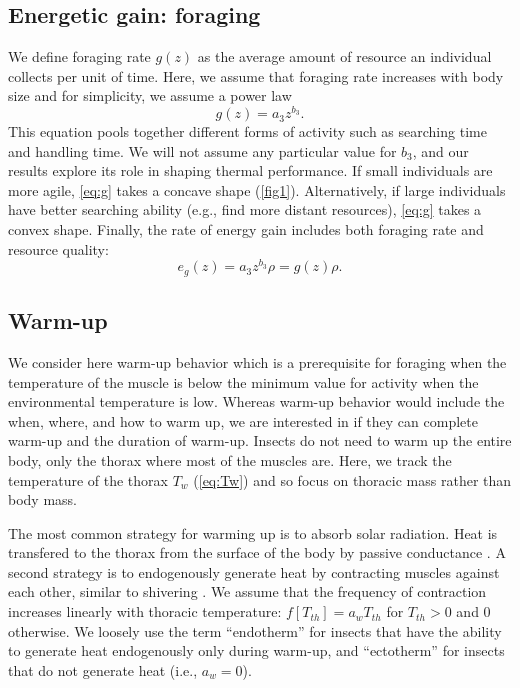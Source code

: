 \subsection*{Energetic gain: foraging}
We define foraging rate $g(z)$ as the average amount of resource an individual collects per unit of time.
Here, we assume that foraging rate increases with body size and for simplicity, we assume a power law  %
\begin{equation} \label{eq:g}
	g(z) = a_3 z^{b_3}.
\end{equation}
This equation pools together different forms of activity such as searching time and handling time. %
We will not assume any particular value for $b_3$, and our results explore its role in shaping thermal performance.
If small individuals are more agile, \cref{eq:g} takes a concave shape (\cref{fig1}).
Alternatively, if large individuals have better searching ability (e.g., find more distant resources), \cref{eq:g} takes a convex shape.
Finally, the rate of energy gain includes both foraging rate and resource quality:
\begin{equation} \label{eq:eg}
	e_g(z) = a_3 z^{b_3}  \rho  = g(z) \rho. 
\end{equation}

\subsection*{Warm-up}
We consider here warm-up behavior which is a prerequisite for foraging when the temperature of the muscle is below the minimum value for activity when the environmental temperature is low. 
Whereas warm-up behavior would include the when, where, and how to warm up, we are interested in if they can complete warm-up and the duration of warm-up. 
Insects do not need to warm up the entire body, only the thorax where most of the muscles are. 
Here, we track the temperature of the thorax $T_w$ (\cref{eq:Tw}) and so focus on thoracic mass rather than body mass.

The most common strategy for warming up is to absorb solar radiation.
Heat is transfered to the thorax from the surface of the body by passive conductance \citep{Bakken1976}.
A second strategy is to endogenously generate heat by contracting muscles against each other, similar to shivering \citep[e.g.,][]{Kammer1974}.
We assume that the frequency of contraction increases linearly with thoracic temperature: $f[T_{th}]  = a_w T_{th}$ for $T_{th}> 0$ and 0 otherwise.
We loosely use the term ``endotherm'' for insects that have the ability to generate heat endogenously only during warm-up, and ``ectotherm'' for insects that do not generate heat (i.e., $a_w = 0$). 

